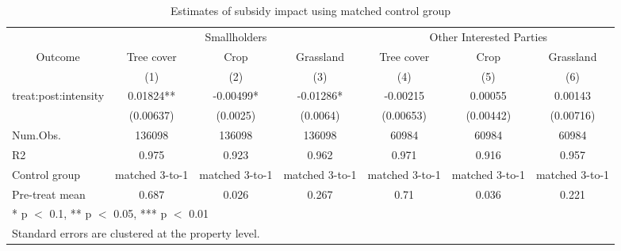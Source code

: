 \begin{table}[!h]
\centering\centering
\caption{Estimates of subsidy impact using matched control group}
\centering
\begin{tabular}[t]{lcccccc}
\toprule
\multicolumn{1}{c}{ } & \multicolumn{3}{c}{Smallholders} & \multicolumn{3}{c}{Other Interested Parties} \\
\cmidrule(l{3pt}r{3pt}){2-4} \cmidrule(l{3pt}r{3pt}){5-7}
\multicolumn{1}{c}{Outcome} & \multicolumn{1}{c}{Tree cover} & \multicolumn{1}{c}{Crop} & \multicolumn{1}{c}{Grassland} & \multicolumn{1}{c}{Tree cover} & \multicolumn{1}{c}{Crop} & \multicolumn{1}{c}{Grassland} \\
\cmidrule(l{3pt}r{3pt}){1-1} \cmidrule(l{3pt}r{3pt}){2-2} \cmidrule(l{3pt}r{3pt}){3-3} \cmidrule(l{3pt}r{3pt}){4-4} \cmidrule(l{3pt}r{3pt}){5-5} \cmidrule(l{3pt}r{3pt}){6-6} \cmidrule(l{3pt}r{3pt}){7-7}
  & (1) & (2) & (3) & (4) & (5) & (6)\\
\midrule
treat:post:intensity & 0.01824** & -0.00499* & -0.01286* & -0.00215 & 0.00055 & 0.00143\\
 & (0.00637) & (0.0025) & (0.0064) & (0.00653) & (0.00442) & (0.00716)\\
\midrule
Num.Obs. & 136098 & 136098 & 136098 & 60984 & 60984 & 60984\\
R2 & 0.975 & 0.923 & 0.962 & 0.971 & 0.916 & 0.957\\
Control group & matched 3-to-1 & matched 3-to-1 & matched 3-to-1 & matched 3-to-1 & matched 3-to-1 & matched 3-to-1\\
Pre-treat mean & 0.687 & 0.026 & 0.267 & 0.71 & 0.036 & 0.221\\
\bottomrule
\multicolumn{7}{l}{\rule{0pt}{1em}* p $<$ 0.1, ** p $<$ 0.05, *** p $<$ 0.01}\\
\multicolumn{7}{l}{\rule{0pt}{1em}Standard errors are clustered at the property level.}\\
\end{tabular}
\end{table}
